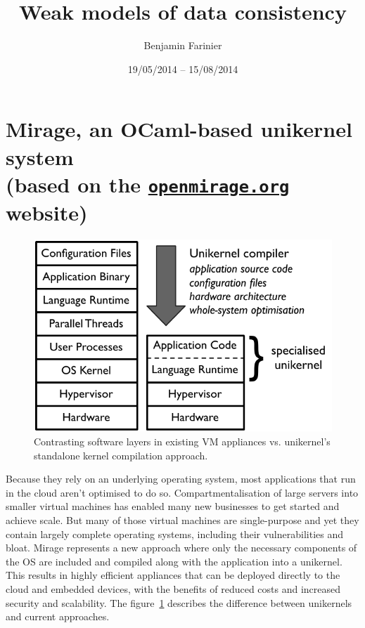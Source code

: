 \documentclass{article}
\title{Weak models of data consistency}
\author{Benjamin Farinier}
\date{19/05/2014 -- 15/08/2014}
\newcommand{\mirage}{Mirage\xspace}
\newcommand{\ocaml}{OCaml\xspace}
\begin{document}
\maketitle
\tableofcontents

\section[\mirage, an \ocaml-based unikernel system]{\mirage, an \ocaml-based unikernel system\\\normalsize\normalfont(based on the \href{http://openmirage.org}{\texttt{openmirage.org}} website)}

\begin{figure}[hbt]
\centering
\includegraphics[scale=0.8]{images/mirage-stack.pdf}
\caption{Contrasting software layers in existing VM appliances vs. unikernel’s standalone kernel compilation approach.}
\label{miragestackgraph}
\end{figure}

Because they rely on an underlying operating system, most applications that run in the cloud aren't optimised to do so.
Compartmentalisation of large servers into smaller virtual machines has enabled many new businesses to get started and achieve scale.
But many of those virtual machines are single-purpose and yet they contain largely complete operating systems, including their vulnerabilities and bloat.
\mirage represents a new approach where only the necessary components of the OS are included and compiled along with the application into a unikernel.
This results in highly efficient appliances that can be deployed directly to the cloud and embedded devices, with the benefits of reduced costs and increased security and scalability. The figure~\ref{miragestackgraph} describes the difference between unikernels and current approaches.
\end{document}
